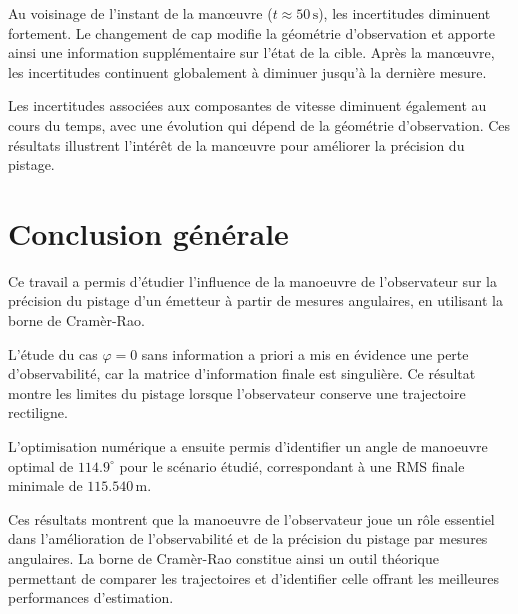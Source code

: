 \documentclass[12pt,a4paper]{article}
\begin{document}
Au voisinage de l'instant de la manœuvre (\(t \approx 50\,\mathrm{s}\)), les incertitudes diminuent fortement. Le changement de cap modifie la géométrie d'observation et apporte ainsi une information supplémentaire sur l'état de la cible. Après la manœuvre, les incertitudes continuent globalement à diminuer jusqu'à la dernière mesure.

Les incertitudes associées aux composantes de vitesse diminuent également au cours du temps, avec une évolution qui dépend de la géométrie d'observation. Ces résultats illustrent l'intérêt de la manœuvre pour améliorer la précision du pistage.

\section{Conclusion générale}

Ce travail a permis d'étudier l'influence de la
manoeuvre de l'observateur sur la précision du
pistage d'un émetteur à partir de mesures angulaires,
en utilisant la borne de Cramèr-Rao.

L'étude du cas $\varphi=0$ sans information a priori
a mis en évidence une perte d'observabilité,
car la matrice d'information finale est singulière.
Ce résultat montre les limites du pistage lorsque
l'observateur conserve une trajectoire rectiligne.

L'optimisation numérique a ensuite permis d'identifier
un angle de manoeuvre optimal de $114.9^\circ$ pour
le scénario étudié, correspondant à une RMS finale
minimale de $115.540\,\mathrm{m}$.

Ces résultats montrent que la manoeuvre de
l'observateur joue un rôle essentiel dans
l'amélioration de l'observabilité et de la précision
du pistage par mesures angulaires.
La borne de Cramèr-Rao constitue ainsi un outil
théorique permettant de comparer les trajectoires
et d'identifier celle offrant les meilleures
performances d'estimation.
\end{document}

